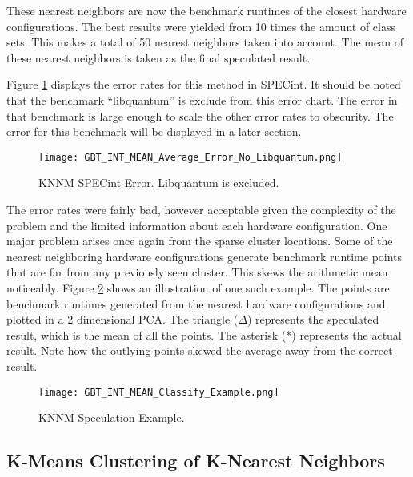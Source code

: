 \documentclass[10pt,twocolumn,letterpaper]{article}
\begin{document}
These nearest neighbors are now the benchmark runtimes of the closest hardware configurations.
The best results were yielded from 10 times the amount of class sets.
This makes a total of 50 nearest neighbors taken into account.
The mean of these nearest neighbors is taken as the final speculated result.

Figure \ref{fig:GBTMeanError} displays the error rates for this method in SPECint.
It should be noted that the benchmark “libquantum” is exclude from this error chart.
The error in that benchmark is large enough to scale the other error rates to obscurity.
The error for this benchmark will be displayed in a later section.

\begin{figure}[t]
\centering
\texttt{[image: GBT\_INT\_MEAN\_Average\_Error\_No\_Libquantum.png]}
\caption{KNNM SPECint Error. Libquantum is excluded.}
\label{fig:GBTMeanError}
\end{figure}

The error rates were fairly bad, however acceptable given the complexity of the problem and the limited information about each hardware configuration.
One major problem arises once again from the sparse cluster locations.
Some of the nearest neighboring hardware configurations generate benchmark runtime points that are far from any previously seen cluster.
This skews the arithmetic mean noticeably.
Figure \ref{fig:MeanClassifyExample} shows an illustration of one such example.
The points are benchmark runtimes generated from the nearest hardware configurations and plotted in a 2 dimensional PCA.
The triangle ($\Delta$) represents the speculated result, which is the mean of all the points.
The asterisk (*) represents the actual result.
Note how the outlying points skewed the average away from the correct result.

\begin{figure}[t]
\centering
\texttt{[image: GBT\_INT\_MEAN\_Classify\_Example.png]}
\caption{KNNM Speculation Example.}
\label{fig:MeanClassifyExample}
\end{figure}

\subsection{K-Means Clustering of K-Nearest Neighbors}
\end{document}
